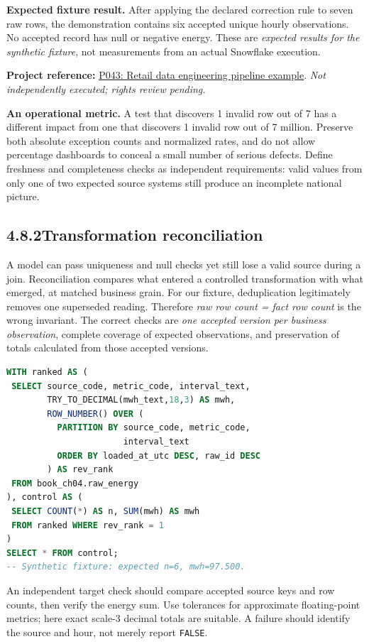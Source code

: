 \documentclass[11pt,twoside]{article}
\newcommand{\topic}[2]{\subsection*{#1\quad #2}}
\newcommand{\repo}[2]{\par\begingroup\fontsize{8.0}{9.6}\selectfont\sffamily\color{inkgray}\textbf{Project reference:} \href{#2}{#1}. \textit{Not independently executed; rights review pending.}\par\endgroup}
\begin{document}
\textbf{Expected fixture result.} After applying the declared correction rule to seven raw rows, the demonstration contains six accepted unique hourly observations. No accepted record has null or negative energy. These are \emph{expected results for the synthetic fixture}, not measurements from an actual Snowflake execution.
\repo{P043: Retail data engineering pipeline example}{https://github.com/Snowflake-Labs/sfguide-building-retail-analytics-de-pipeline}


\textbf{An operational metric.} A test that discovers 1 invalid row out of 7 has a different impact from one that discovers 1 invalid row out of 7 million. Preserve both absolute exception counts and normalized rates, and do not allow percentage dashboards to conceal a small number of serious defects. Define freshness and completeness checks as independent requirements: valid values from only one of two expected source systems still produce an incomplete national picture.

\newpage
\topic{4.8.2}{Transformation reconciliation}
A model can pass uniqueness and null checks yet still lose a valid source during a join. Reconciliation compares what entered a controlled transformation with what emerged, at matched business grain. For our fixture, deduplication legitimately removes one superseded reading. Therefore \emph{raw row count = fact row count} is the wrong invariant. The correct checks are \emph{one accepted version per business observation}, complete coverage of expected observations, and preservation of totals calculated from those accepted versions.

\begin{lstlisting}[language=SQL,caption={Independent control total on accepted raw versions.}]
WITH ranked AS (
 SELECT source_code, metric_code, interval_text,
        TRY_TO_DECIMAL(mwh_text,18,3) AS mwh,
        ROW_NUMBER() OVER (
          PARTITION BY source_code, metric_code,
                       interval_text
          ORDER BY loaded_at_utc DESC, raw_id DESC
        ) AS rev_rank
 FROM book_ch04.raw_energy
), control AS (
 SELECT COUNT(*) AS n, SUM(mwh) AS mwh
 FROM ranked WHERE rev_rank = 1
)
SELECT * FROM control;
-- Synthetic fixture: expected n=6, mwh=97.500.
\end{lstlisting}

An independent target check should compare accepted source keys and row counts, then verify the energy sum. Use tolerances for approximate floating-point metrics; here exact scale-3 decimal totals are suitable. A failure should identify the source and hour, not merely report \texttt{FALSE}.
\end{document}
